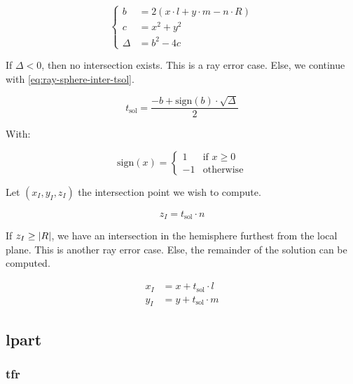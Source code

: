 \begin{equation} \label{eq:ray-sphere-inter1}
\begin{cases}
b &= 2 (x \cdot l + y \cdot m - n \cdot R) \\
c &= x^2 + y^2 \\
\Delta &= b^2 - 4 c
\end{cases}
\end{equation}

If $\Delta < 0$, then no intersection exists. This is a ray error case. Else,
we continue with \cref{eq:ray-sphere-inter-tsol}.

\begin{equation} \label{eq:ray-sphere-inter-tsol}
t_\textrm{sol} = \frac{-b + \textrm{sign}(b) \cdot \sqrt{\Delta}}{2}
\end{equation}

With:

\begin{equation}
\textrm{sign}(x) = \begin{cases}
1 & \text{if } x \geq 0 \\
-1 & \text{otherwise}
\end{cases}
\end{equation}

Let $(x_I, y_I, z_I)$ the intersection point we wish to compute.

\begin{equation}
z_I = t_\textrm{sol} \cdot n
\end{equation}

If $z_I \geq \abs{R}$, we have an intersection in the hemisphere furthest from
the local plane. This is another ray error case. Else, the remainder of the
solution can be computed.

\begin{equation}
\begin{aligned}
x_I &= x + t_\textrm{sol} \cdot l \\
y_I &= y + t_\textrm{sol} \cdot m
\end{aligned}
\end{equation}

\subsection{lpart}

\subsubsection{tfr}

